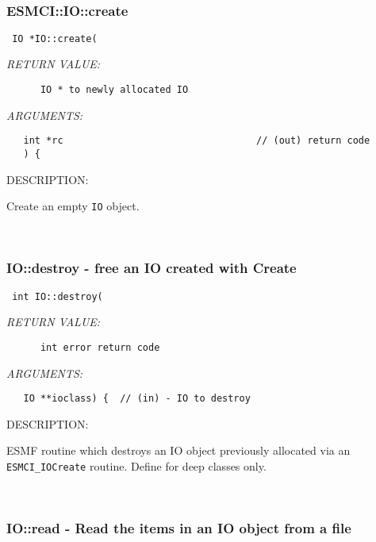  
\mbox{}\hrulefill\
 
\subsubsection [ESMCI::IO::create] {ESMCI::IO::create}


  
\begin{verbatim} IO *IO::create(\end{verbatim}{\em RETURN VALUE:}
\begin{verbatim}      IO * to newly allocated IO\end{verbatim}{\em ARGUMENTS:}
\begin{verbatim}   int *rc                                  // (out) return code
   ) {\end{verbatim}
{\sf DESCRIPTION:\\ }


      Create an empty {\tt IO} object. 
 
\mbox{}\hrulefill\
 
\subsubsection [IO::destroy] {IO::destroy - free an IO created with Create}


  
\begin{verbatim} int IO::destroy(\end{verbatim}{\em RETURN VALUE:}
\begin{verbatim}      int error return code\end{verbatim}{\em ARGUMENTS:}
\begin{verbatim}   IO **ioclass) {  // (in) - IO to destroy\end{verbatim}
{\sf DESCRIPTION:\\ }


        ESMF routine which destroys an IO object previously allocated
        via an {\tt ESMCI\_IOCreate} routine.  Define for deep classes only.
   
 
\mbox{}\hrulefill\ 
 
\subsubsection [IO::read] {IO::read - Read the items in an IO object from a file}



